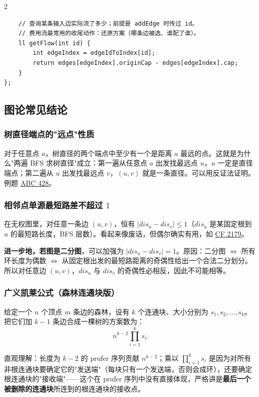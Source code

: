 \begin{multicols*}{2}
\begin{verbatim}
    // 查询某条输入边实际流了多少；前提是 addEdge 时传过 id。
    // 费用流最常用的收尾动作：还原方案（哪条边被选、谁配了谁）。
    ll getFlow(int id) {
        int edgeIndex = edgeIdToIndex[id];
        return edges[edgeIndex].originCap - edges[edgeIndex].cap;
    }
};
		\end{verbatim}


		\subsection{图论常见结论}

		\subsubsection{树直径端点的"远点"性质}

		对于任意点 $a$，树直径的两个端点中至少有一个是距离 $a$ 最远的点。这就是为什么"两遍 BFS 求树直径"成立：第一遍从任意点 $a$ 出发找最远点 $u$，$u$ 一定是直径端点；第二遍从 $u$ 出发找最远点 $v$，$(u, v)$ 就是一条直径。可以用反证法证明。例题 \href{https://atcoder.jp/contests/abc428/submissions/70535587}{ABC 428}。

		\subsubsection{相邻点单源最短路差不超过 $1$}

		在无权图里，对任意一条边 $(u, v)$，恒有 $|dis_u - dis_v| \leq 1$（$dis_u$ 是某固定根到 $u$ 的最短路长度，BFS 层数）。看起来像废话，但偶尔确实有用，如 \href{https://codeforces.com/contest/2179/submission/355080390}{CF 2179}。

		\textbf{进一步地，若图是二分图}，可以加强为 $|dis_u - dis_v| = 1$。原因：二分图 $\iff$ 所有环长度为偶数 $\iff$ 从固定根出发的最短路距离的奇偶性给出一个合法二分划分。所以对任意边 $(u, v)$，$dis_u$ 与 $dis_v$ 的奇偶性必相反，因此不可能相等。

		\subsubsection{广义凯莱公式（森林连通块版）}

		给定一个 $n$ 个顶点 $m$ 条边的森林，设有 $k$ 个连通块、大小分别为 $s_1, s_2, \dots, s_k$。把它们加 $k - 1$ 条边合成一棵树的方案数为：
		$$
		n^{k-2} \prod_{i=1}^{k} s_i.
		$$

		直观理解：长度为 $k - 2$ 的 prufer 序列贡献 $n^{k - 2}$；乘以 $\prod_{i=1}^{k} s_i$ 是因为对所有非根连通块要确定它的"发送端"（每块只有一个发送端，否则会成环），还要确定根连通块的"接收端"——这个在 prufer 序列中没有直接体现，严格讲是\textbf{最后一个被删除的连通块}所连到的根连通块的接收点。


\end{multicols*}
